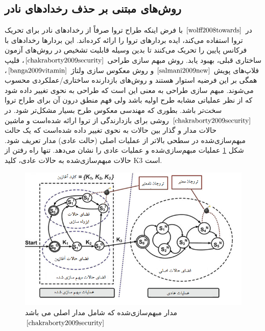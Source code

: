 \subsection {روش‌های مبتنی بر حذف رخدادهای نادر}
در $\cite{wolff2008towards}$ با فرض اینکه طراح تروا صرفاً از رخدادهای نادر برای تحریک تروا استفاده می‌کند، ایده بردارهای تروا را ارائه کرده‌اند. این بردارها رخدادهای با فرکانس پایین را تحریک می‌کنند تا بدین وسیله قابلیت تشخیص در روش‌های آزمون ساختاری قبلی، بهبود یابد. روش مبهم سازی طراحی $\cite{chakraborty2009security}$، فلیپ فلاپ‌های پویش $\cite{salmani2009new}$ و روش معکوس سازی ولتاژ $\cite{banga2009vitamin}$، همگی بر این فرضیه استوار هستند و روش‌های بازدارنده ساختاری/عملکردی محسوب می‌شوند.
مبهم سازی طراحی به معنی این است که طراحی به نحوی تغییر داده شود که از نظر عملیاتی مشابه طرح اولیه باشد ولی فهم منطق درون آن برای طراح تروا سخت‌تر باشد. بطوری که مهندسی معکوس طرح بسیار مشکل‌تر شود. در $\cite{chakraborty2009security}$ روشی برای بازدارندگی از تروا ارائه شده‌است و ماشین حالات مدار و گذار بین حالات به نحوی تغییر داده شده‌است که یک حالت مبهم‌سازی‌شده در سطحی بالاتر از عملیات اصلی (حالت عادی) مدار تعریف شود. شکل \ref{fig4-5} عملیات مبهم‌سازی‌شده و عملیات عادی را نشان می‌دهد. تنها راه رفتن از حالات مبهم‌سازی‌شده به حالات عادی، کلید K3 است.
\begin{figure}
	\begin{center}
		\includegraphics[scale=1]{figs/fig4-5.png}
		\caption[مدار مبهم‌سازی‌شده که شامل مدار اصلی می باشد]
		{مدار مبهم‌سازی‌شده که شامل مدار اصلی می باشد $\cite{chakraborty2009security}$}
		\label{fig4-5}
	\end{center}
\end{figure} 

